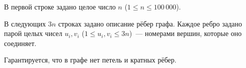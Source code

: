 В первой строке задано целое число $n$ ($1 \leq n \leq 100\,000$).

В следующих $3n$ строках задано описание рёбер графа. Каждое ребро задано парой целых чисел $u_i, v_i$ ($1 \leq u_i, v_i \leq 3n$)~--- номерами вершин, которые оно соединяет.

Гарантируется, что в графе нет петель и кратных рёбер.
